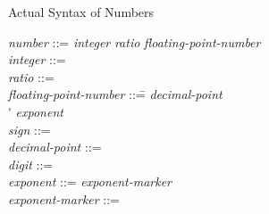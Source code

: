 {\newpage
\clearpage
\samepage \begin{table}%
[t]
\caption{Actual Syntax of Numbers}
\label{NUMBER-SYNTAX-TABLE}
\tabbingsep=0pt
\normalsize
\begin{tabbing}
{\it number} ::= {\it integer} {\Mor} {\it ratio} {\Mor} {\it floating-point-number} \\ 
{\it integer} ::=    \\ 
{\it ratio} ::=   \cd{/}  \\ 
{\it floating-point-number} ::=\=   {\it decimal-point}   \\ 
\>{\Mor} \'   {\it exponent} \\  {\it sign} ::= \cd{+} {\Mor} \cd{-} \\ 
{\it decimal-point} ::=  \\ 
{\it digit} ::=  {\Mor}  {\Mor}  {\Mor}  {\Mor} 
         {\Mor}  {\Mor}  {\Mor}  {\Mor}  {\Mor}  \\ 
{\it exponent} ::= {\it exponent-marker}   \\ 
{\it exponent-marker} ::=  {\Mor}  {\Mor}  {\Mor}  {\Mor} 
                   {\Mor}  {\Mor}  {\Mor}  {\Mor}  {\Mor} 
\end{tabbing}
\end{table}
}

